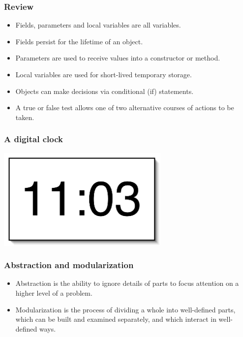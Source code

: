 \documentclass{beamer}
\begin{document}
\begin{frame}
\frametitle{Review}
\begin{itemize}
\item Fields, parameters and local variables are all variables.
\item Fields persist for the lifetime of an object.
\item Parameters are used to receive values into a constructor or method.
\item Local variables are used for short-lived temporary storage. 
\item Objects can make decisions via conditional (if) statements.
\item A true or false test allows one of two alternative courses of actions to be taken.
\end{itemize}
\end{frame}

\begin{frame}
\frametitle{A digital clock}
\begin{center}
\includegraphics[height=5cm,keepaspectratio]{./figures/clock}
\end{center}
\end{frame}

\begin{frame}
\frametitle{Abstraction and modularization}
\begin{itemize}
\item \alert{Abstraction} is the ability to ignore details of parts to focus attention on a higher level of a problem. 
\item \alert{Modularization} is the process of dividing a whole into well-defined parts, which can be built and examined separately, and which interact in well-defined ways. 
\end{itemize}
\end{frame}
\end{document}
